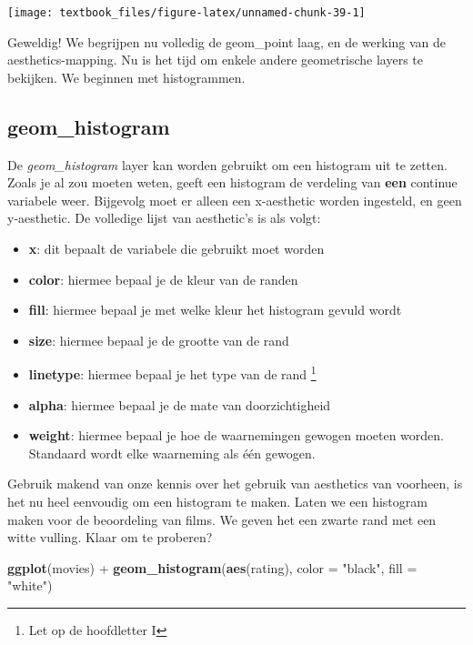 \documentclass[]{tufte-book}
\newenvironment{Shaded}{}{}
\newcommand{\DataTypeTok}[1]{\textcolor[rgb]{0.56,0.13,0.00}{#1}}
\newcommand{\KeywordTok}[1]{\textcolor[rgb]{0.00,0.44,0.13}{\textbf{#1}}}
\newcommand{\NormalTok}[1]{#1}
\newcommand{\OperatorTok}[1]{\textcolor[rgb]{0.40,0.40,0.40}{#1}}
\newcommand{\StringTok}[1]{\textcolor[rgb]{0.25,0.44,0.63}{#1}}
\providecommand{\tightlist}{%
  \setlength{\itemsep}{0pt}\setlength{\parskip}{0pt}}
\begin{document}
\texttt{[image: textbook\_files/figure-latex/unnamed-chunk-39-1]}

Geweldig! We begrijpen nu volledig de geom\_point laag, en de werking van de aesthetics-mapping. Nu is het tijd om enkele andere geometrische layers te bekijken. We beginnen met histogrammen.

\hypertarget{geom_histogram}{%
\subsection{geom\_histogram}\label{geom_histogram}}

De \emph{geom\_histogram} layer kan worden gebruikt om een histogram uit te zetten. Zoals je al zou moeten weten, geeft een histogram de verdeling van \textbf{een} continue variabele weer. Bijgevolg moet er alleen een x-aesthetic worden ingesteld, en geen y-aesthetic. De volledige lijst van aesthetic's is als volgt:

\begin{itemize}
\tightlist
\item
  \textbf{x}: dit bepaalt de variabele die gebruikt moet worden
\item
  \textbf{color}: hiermee bepaal je de kleur van de randen
\item
  \textbf{fill}: hiermee bepaal je met welke kleur het histogram gevuld wordt
\item
  \textbf{size}: hiermee bepaal je de grootte van de rand
\item
  \textbf{linetype}: hiermee bepaal je het type van de rand \footnote{Let op de hoofdletter I}
\item
  \textbf{alpha}: hiermee bepaal je de mate van doorzichtigheid
\item
  \textbf{weight}: hiermee bepaal je hoe de waarnemingen gewogen moeten worden. Standaard wordt elke waarneming als één gewogen.
\end{itemize}

Gebruik makend van onze kennis over het gebruik van aesthetics van voorheen, is het nu heel eenvoudig om een histogram te maken. Laten we een histogram maken voor de beoordeling van films. We geven het een zwarte rand met een witte vulling. Klaar om te proberen?

\begin{Shaded}
\begin{Highlighting}[]
\KeywordTok{ggplot}\NormalTok{(movies) }\OperatorTok{+}
\StringTok{    }\KeywordTok{geom_histogram}\NormalTok{(}\KeywordTok{aes}\NormalTok{(rating), }\DataTypeTok{color =} \StringTok{"black"}\NormalTok{, }\DataTypeTok{fill =} \StringTok{"white"}\NormalTok{)}
\end{Highlighting}
\end{Shaded}
\end{document}
